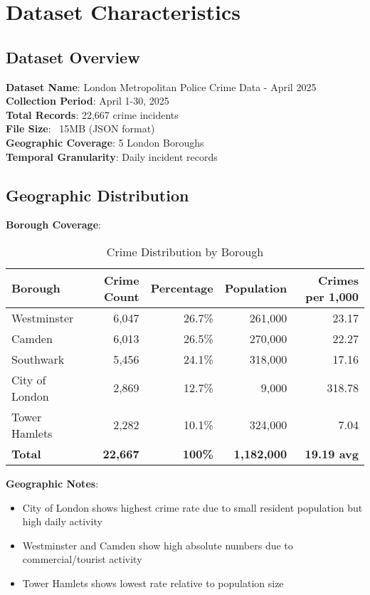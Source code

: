 \documentclass[12pt,a4paper]{article}
\begin{document}
\section{Dataset Characteristics}

\subsection{Dataset Overview}

\textbf{Dataset Name}: London Metropolitan Police Crime Data - April 2025\\
\textbf{Collection Period}: April 1-30, 2025\\
\textbf{Total Records}: 22,667 crime incidents\\
\textbf{File Size}: ~15MB (JSON format)\\
\textbf{Geographic Coverage}: 5 London Boroughs\\
\textbf{Temporal Granularity}: Daily incident records

\subsection{Geographic Distribution}

\textbf{Borough Coverage}:

\begin{table}[h]
\centering
\caption{Crime Distribution by Borough}
\begin{tabular}{@{}lrrrr@{}}
\toprule
Borough & Crime Count & Percentage & Population & Crimes per 1,000 \\
\midrule
Westminster & 6,047 & 26.7\% & 261,000 & 23.17 \\
Camden & 6,013 & 26.5\% & 270,000 & 22.27 \\
Southwark & 5,456 & 24.1\% & 318,000 & 17.16 \\
City of London & 2,869 & 12.7\% & 9,000 & 318.78 \\
Tower Hamlets & 2,282 & 10.1\% & 324,000 & 7.04 \\
\textbf{Total} & \textbf{22,667} & \textbf{100\%} & \textbf{1,182,000} & \textbf{19.19 avg} \\
\bottomrule
\end{tabular}
\end{table}

\textbf{Geographic Notes}:
\begin{itemize}
    \item City of London shows highest crime rate due to small resident population but high daily activity
    \item Westminster and Camden show high absolute numbers due to commercial/tourist activity
    \item Tower Hamlets shows lowest rate relative to population size
\end{itemize}
\end{document}
